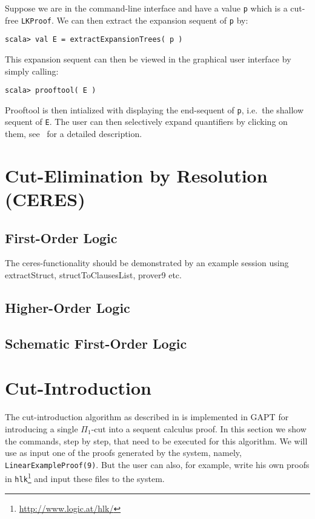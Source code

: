 \documentclass[a4paper,11pt]{article}
\newcommand{\cli}[1]{{\tt {#1}}}
\newenvironment{meta}{\color{red}}{\color{black}}
\begin{document}
Suppose we are in the command-line interface and have a value \cli{p} which is a cut-free \cli{LKProof}.
We can then extract the expansion sequent of \cli{p} by:
\begin{lstlisting}
scala> val E = extractExpansionTrees( p )
\end{lstlisting}
This expansion sequent can then be viewed in the graphical user interface by simply calling:
\begin{lstlisting}
scala> prooftool( E )
\end{lstlisting}
Prooftool is then intialized with displaying the end-sequent of \cli{p}, i.e.\ the shallow sequent
of \cli{E}. The user can then selectively expand quantifiers by clicking on them, see~\cite{Hetzl13Understanding}
for a detailed description.


\section{Cut-Elimination by Resolution (CERES)}


\subsection{First-Order Logic}

\begin{meta}
The ceres-functionality should be demonstrated by an example
session using extractStruct, structToClausesList, prover9 etc.
\end{meta}


\subsection{Higher-Order Logic}


\subsection{Schematic First-Order Logic}


\section{Cut-Introduction}

The cut-introduction algorithm as described in \cite{HetzlXXAlgorithmic} is
implemented in GAPT for introducing a single $\Pi_1$-cut into a sequent calculus
proof. In this section we show the commands, step by step, that need to be
executed for this algorithm. We will use as input one of the proofs generated by
the system, namely, \texttt{LinearExampleProof(9)}. But the
user can also, for example, write his own proofs in
\texttt{hlk}\footnote{\url{http://www.logic.at/hlk/}} and input these files to
the system. 
\end{document}
